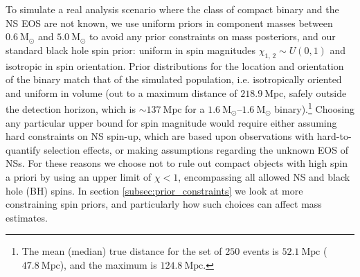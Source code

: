 To simulate a real analysis scenario where the class of compact binary and the NS EOS are not known, we use uniform priors in component masses between $0.6~\mathrm{M}_\odot$ and $5.0~\mathrm{M}_\odot$ to avoid any prior constraints on mass posteriors, and our standard black hole spin prior: uniform in spin magnitudes $\chi_{1,\,2} \sim U(0, 1)$ and isotropic in spin orientation. Prior distributions for the location and orientation of the binary match that of the simulated population, i.e. isotropically oriented and uniform in volume (out to a maximum distance of $218.9~\mathrm{Mpc}$, safely outside the detection horizon, which is $\sim137~\mathrm{Mpc}$ for a $1.6~\mathrm{M}_\odot$--$1.6~\mathrm{M}_\odot$ binary).\footnote{The mean (median) true distance for the set of $250$ events is $52.1~\mathrm{Mpc}$ ($47.8~\mathrm{Mpc}$), and the maximum is $124.8~\mathrm{Mpc}$.}  Choosing any particular upper bound for spin magnitude would require either assuming hard constraints on NS spin-up, which are based upon observations with hard-to-quantify selection effects, or making assumptions regarding the unknown EOS of NSs. For these reasons we choose not to rule out compact objects with high spin a priori by using an upper limit of $\chi < 1$, encompassing all allowed NS and black hole (BH) spins.  In section \ref{subsec:prior_constraints} we look at more constraining spin priors, and particularly how such choices can affect mass estimates.

